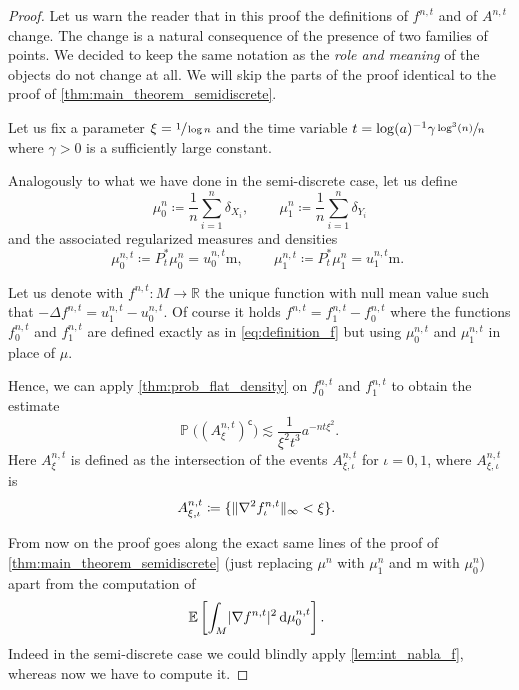 \documentclass[10pt]{amsart}
\theoremstyle{plain}
\theoremstyle{definition}
\numberwithin{equation}{section}
\newcommand{\RR}{\ensuremath{\mathbb R}}
\renewcommand{\complement}{\ensuremath{\mathsf{c}}}\newcommand{\de}{\ensuremath{\,\mathrm d}}
\newcommand{\defeq}{\ensuremath{\coloneqq}}
\newcommand{\E}[1]{\ensuremath{\operatorname{\mathbb{E}}\left[#1\right]}}
\newcommand{\lapl}{\ensuremath{\Delta}}
\newcommand{\bP}[1]{\ensuremath{\operatorname{\mathbb{P}}\bigl(#1\bigr)}}
\renewcommand{\comma}{\ensuremath{\text{, }}}
\newcommand{\comma}{\ensuremath{\text{, }}}
\newcommand{\fullstop}{\ensuremath{\text{. }}}
\newcommand{\m}{\ensuremath{\mathrm m}}
\DeclarePairedDelimiter\abs{\lvert}{\rvert}
\DeclarePairedDelimiter\norm{\lVert}{\rVert}
\begin{document}
\begin{proof}
Let us warn the reader that in this proof the definitions of $f^{n,t}$ and of $A^{n,t}$ change.
The change is a natural consequence of the presence of two families of points. We decided to keep the same
notation as the \emph{role and meaning} of the objects do not change at all.
We will skip the parts of the proof identical to the proof of
\cref{thm:main_theorem_semidiscrete}.

Let us fix a parameter $\xi=\sfrac1{\log n}$ and the time variable
$t=\log(a)^{-1}\gamma\sfrac{\log^3(n)}{n}$ where $\gamma>0$ is a sufficiently large constant.

Analogously to what we have done in the semi-discrete case, let us define
\begin{equation*}
\mu_0^n \defeq \frac1n\sum_{i=1}^n \delta_{X_i} \comma \quad\quad
\mu_1^n \defeq \frac1n\sum_{i=1}^n \delta_{Y_i}
\end{equation*}
and the associated regularized measures and densities
\begin{equation*}
\mu_0^{n,t} \defeq P_t^*\mu_0^n = u_0^{n,t}\m \comma \quad\quad
\mu_1^{n,t} \defeq P_t^*\mu_1^n = u_1^{n,t}\m \fullstop
\end{equation*}

Let us denote with $f^{n,t}:M\to\RR$ the unique function with null mean value such that
$-\lapl f^{n,t} = u_1^{n,t}-u_0^{n,t}$. Of course it holds $f^{n,t} = f_1^{n,t}-f_0^{n,t}$ where the
functions $f_0^{n,t}$ and $f_1^{n,t}$ are defined exactly as in \cref{eq:definition_f} but using $\mu_0^{n,t}$ and $\mu_1^{n,t}$
in place of $\mu$.

Hence, we can apply \cref{thm:prob_flat_density} on $f_0^{n,t}$ and $f_1^{n,t}$ to obtain the estimate
\begin{equation*}
\bP{(A^{n,t}_\xi)^{\complement}} \lesssim \frac1{\xi^2t^3}a^{-nt\xi^2} \fullstop
\end{equation*}
Here $A^{n,t}_\xi$ is defined as the intersection of the events $A^{n,t}_{\xi,\iota}$ for $\iota=0, 1$, where $A^{n,t}_{\xi,\iota}$ is
\begin{equation*}
A^{n,t}_{\xi,\iota} \defeq \{\norm{\nabla^2f_\iota^{n,t}}_\infty < \xi\} \fullstop
\end{equation*}

From now on the proof goes along the exact same lines of the proof of \cref{thm:main_theorem_semidiscrete}
(just replacing $\mu^n$ with $\mu_1^n$ and $\m$ with $\mu_0^n$) apart from the computation of
\begin{equation*}
\E{\int_M \abs{\nabla f^{n,t}}^2\de\mu_0^{n,t} } \fullstop
\end{equation*}
Indeed in the semi-discrete case we could blindly apply \cref{lem:int_nabla_f}, whereas now we have to
compute it.


\end{proof}
\end{document}
